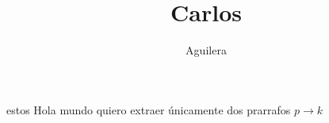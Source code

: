 \documentclass[a4paper]{article}
\title{Carlos}
\author{Aguilera}
\begin{document}
estos 
Hola mundo quiero extraer únicamente 
dos 
prarrafos
$p \to k$ 
\end{document}
